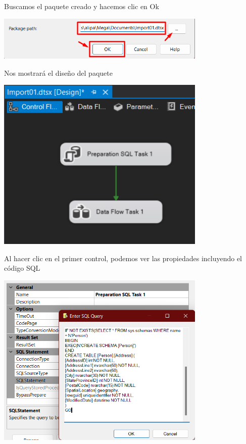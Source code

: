 \documentclass[12pt,letterpaper]{article}
\begin{document}
Buscamos el paquete creado y hacemos clic en Ok

\begin{center}
    \includegraphics[width=10cm]{./img/img11.png}
\end{center}

Nos mostrará el diseño del paquete

\begin{center}
    \includegraphics[width=10cm]{./img/img12.png}
\end{center}

Al hacer clic en el primer control, podemos ver las propiedades incluyendo el código SQL 

\begin{center}
    \includegraphics[width=10cm]{./img/img14.png}
\end{center}
\end{document}
